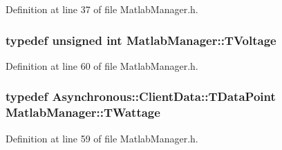 Definition at line 37 of file Matlab\-Manager.\-h.

\hypertarget{class_matlab_manager_a00f47f07c7dfd449fc39db6c09f6304a}{
\subsubsection[{T\-Voltage}]{\setlength{\rightskip}{0pt plus 5cm}typedef unsigned int {\bf Matlab\-Manager\-::\-T\-Voltage}}}\label{class_matlab_manager_a00f47f07c7dfd449fc39db6c09f6304a}


Definition at line 60 of file Matlab\-Manager.\-h.

\hypertarget{class_matlab_manager_a410b78f356aeacba5c43efee93d8c27d}{
\subsubsection[{T\-Wattage}]{\setlength{\rightskip}{0pt plus 5cm}typedef {\bf Asynchronous\-::\-Client\-Data\-::\-T\-Data\-Point} {\bf Matlab\-Manager\-::\-T\-Wattage}}}\label{class_matlab_manager_a410b78f356aeacba5c43efee93d8c27d}


Definition at line 59 of file Matlab\-Manager.\-h.



